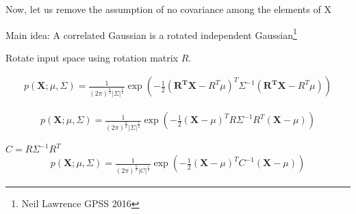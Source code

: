 \documentclass{beamer}
\begin{document}
\begin{frame}
	Now, let us remove the assumption of no covariance among the elements of X
	
	Main idea: A correlated Gaussian is a rotated independent Gaussian\footnote{Neil Lawrence GPSS 2016}
	
	
	Rotate input space using rotation matrix $R$.
	
		\begin{gather}
		p(\mathbf{X} ; \mu, \Sigma)=\frac{1}{(2 \pi)^{\frac{n}{2}}|\Sigma|^{\frac{1}{2}}} \exp \left(-\frac{1}{2}(\mathbf{R^TX}-R^T\mu)^{T} \Sigma^{-1}(\mathbf{R^TX}-R^T\mu)\right)
	\end{gather}

	
\begin{gather}
	p(\mathbf{X} ; \mu, \Sigma)=\frac{1}{(2 \pi)^{\frac{n}{2}}|\Sigma|^{\frac{1}{2}}} \exp \left(-\frac{1}{2}(\mathbf{X}-\mu)^{T} R\Sigma^{-1}R^T(\mathbf{X}-\mu)\right)
\end{gather}
	
	
\end{frame}

\begin{frame}
	
	$C = R\Sigma^{-1}R^T$
\begin{gather}
	p(\mathbf{X} ; \mu, \Sigma)=\frac{1}{(2 \pi)^{\frac{n}{2}}|C|^{\frac{1}{2}}} \exp \left(-\frac{1}{2}(\mathbf{X}-\mu)^{T} C^{-1}(\mathbf{X}-\mu)\right)
\end{gather}
\end{frame}
\end{document}
